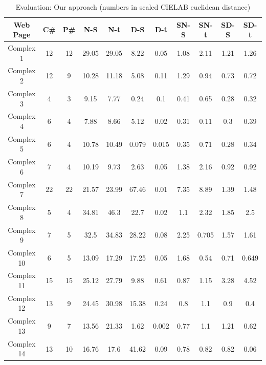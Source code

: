 \begin{table}[!htb]
\caption{Evaluation: Our approach (numbers in scaled CIELAB euclidean distance)}
\centering
\begin{tabular}{c c c c c c c c c c c}
\hline\hline
Web Page & C\# & P\# & N-S & N-t & D-S & D-t & SN-S & SN-t & SD-S & SD-t\\ [0.5ex]
\hline
Complex 1&12&12&29.05&29.05&8.22&0.05&1.08&2.11&1.21&1.26\\
Complex 2&12&9&10.28&11.18&5.08&0.11&1.29&0.94&0.73&0.72\\
Complex 3&4&3&9.15&7.77&0.24&0.1&0.41&0.65&0.28&0.32\\
Complex 4&6&4&7.88&8.66&5.12&0.02&0.31&0.11&0.3&0.39\\
Complex 5&6&4&10.78&10.49&0.079&0.015&0.35&0.71&0.28&0.34\\
Complex 6&7&4&10.19&9.73&2.63&0.05&1.38&2.16&0.92&0.92\\
Complex 7&22&22&21.57&23.99&67.46&0.01&7.35&8.89&1.39&1.48\\
Complex 8&5&4&34.81&46.3&22.7&0.02&1.1&2.32&1.85&2.5\\
Complex 9&7&5&32.5&34.83&28.22&0.08&2.25&0.705&1.57&1.61\\
Complex 10&6&5&13.09&17.29&17.25&0.05&1.68&0.54&0.71&0.649\\
Complex 11&15&15&25.12&27.79&9.88&0.61&0.87&1.15&3.28&4.52\\
Complex 12&13&9&24.45&30.98&15.38&0.24&0.8&1.1&0.9&0.4\\
Complex 13&9&7&13.56&21.33&1.62&0.002&0.77&1.1&1.21&0.62\\
Complex 14&13&10&16.76&17.6&41.62&0.09&0.78&0.82&0.82&0.06\\[1ex]
\hline
\end{tabular}
\label{table:nonlin}
\end{table}



